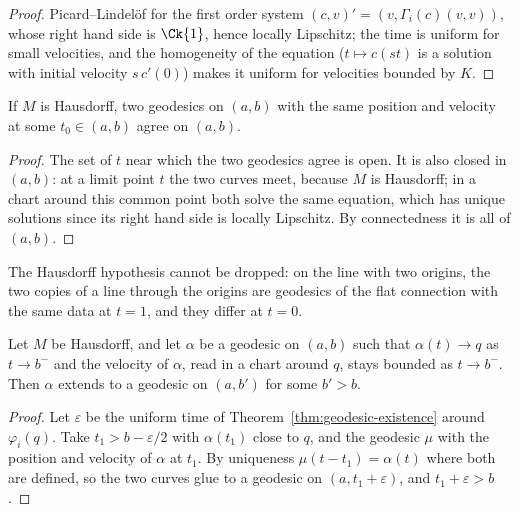 \begin{proof}
  \leanok
  Picard--Lindel\"of for the first order system $(c, v)' = (v, \Gamma_i(c)(v, v))$, whose right
  hand side is $\Ck{1}$, hence locally Lipschitz; the time is uniform for small velocities, and the
  homogeneity of the equation ($t \mapsto c(st)$ is a solution with initial velocity $s\, c'(0)$)
  makes it uniform for velocities bounded by $K$.
\end{proof}

\begin{theorem}
  \label{thm:geodesic-uniqueness}
  \leanok
  If $M$ is Hausdorff, two geodesics on $(a, b)$ with the same position and velocity at some
  $t_0 \in (a, b)$ agree on $(a, b)$.
\end{theorem}

\begin{proof}
  \leanok
  The set of $t$ near which the two geodesics agree is open. It is also closed in $(a, b)$: at a
  limit point $t$ the two curves meet, because $M$ is Hausdorff; in a chart around this common
  point both solve the same equation, which has unique solutions since its right hand side is
  locally Lipschitz. By connectedness it is all of $(a, b)$.
\end{proof}

\begin{remark}
  The Hausdorff hypothesis cannot be dropped: on the line with two origins, the two copies of a
  line through the origins are geodesics of the flat connection with the same data at $t = 1$, and
  they differ at $t = 0$.
\end{remark}

\begin{theorem}
  \label{thm:geodesic-extension}
  \leanok
  Let $M$ be Hausdorff, and let $\alpha$ be a geodesic on $(a, b)$ such that $\alpha(t) \to q$ as
  $t \to b^-$ and the velocity of $\alpha$, read in a chart around $q$, stays bounded as
  $t \to b^-$. Then $\alpha$ extends to a geodesic on $(a, b')$ for some $b' > b$.
\end{theorem}

\begin{proof}
  \leanok
  Let $\varepsilon$ be the uniform time of Theorem~\ref{thm:geodesic-existence} around
  $\varphi_i(q)$. Take $t_1 > b - \varepsilon/2$ with $\alpha(t_1)$ close to $q$, and the geodesic
  $\mu$ with the position and velocity of $\alpha$ at $t_1$. By uniqueness
  $\mu(t - t_1) = \alpha(t)$ where both are defined, so the two curves glue to a geodesic on
  $(a, t_1 + \varepsilon)$, and $t_1 + \varepsilon > b$.
\end{proof}

